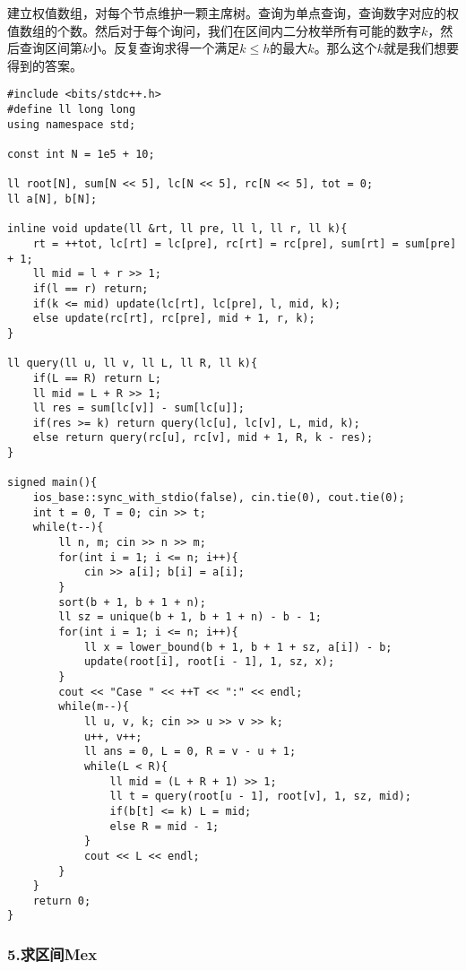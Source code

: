 \documentclass[]{article}
\begin{document}
建立权值数组，对每个节点维护一颗主席树。查询为单点查询，查询数字对应的权值数组的个数。然后对于每个询问，我们在区间内二分枚举所有可能的数字\(k\)，然后查询区间第\(k\)小。反复查询求得一个满足\(k \leq h\)的最大\(k\)。那么这个\(k\)就是我们想要得到的答案。

\begin{verbatim}
#include <bits/stdc++.h>
#define ll long long
using namespace std;

const int N = 1e5 + 10;

ll root[N], sum[N << 5], lc[N << 5], rc[N << 5], tot = 0;
ll a[N], b[N];

inline void update(ll &rt, ll pre, ll l, ll r, ll k){
    rt = ++tot, lc[rt] = lc[pre], rc[rt] = rc[pre], sum[rt] = sum[pre] + 1;
    ll mid = l + r >> 1;
    if(l == r) return;
    if(k <= mid) update(lc[rt], lc[pre], l, mid, k);
    else update(rc[rt], rc[pre], mid + 1, r, k);
}

ll query(ll u, ll v, ll L, ll R, ll k){
    if(L == R) return L;
    ll mid = L + R >> 1;
    ll res = sum[lc[v]] - sum[lc[u]];
    if(res >= k) return query(lc[u], lc[v], L, mid, k);
    else return query(rc[u], rc[v], mid + 1, R, k - res);
}

signed main(){
    ios_base::sync_with_stdio(false), cin.tie(0), cout.tie(0);
    int t = 0, T = 0; cin >> t;
    while(t--){
        ll n, m; cin >> n >> m;
        for(int i = 1; i <= n; i++){
            cin >> a[i]; b[i] = a[i];
        }
        sort(b + 1, b + 1 + n);
        ll sz = unique(b + 1, b + 1 + n) - b - 1;
        for(int i = 1; i <= n; i++){
            ll x = lower_bound(b + 1, b + 1 + sz, a[i]) - b;
            update(root[i], root[i - 1], 1, sz, x);
        }
        cout << "Case " << ++T << ":" << endl;
        while(m--){
            ll u, v, k; cin >> u >> v >> k;
            u++, v++;
            ll ans = 0, L = 0, R = v - u + 1;
            while(L < R){
                ll mid = (L + R + 1) >> 1;
                ll t = query(root[u - 1], root[v], 1, sz, mid);
                if(b[t] <= k) L = mid;
                else R = mid - 1;
            }
            cout << L << endl;
        }
    }
    return 0;
}
\end{verbatim}

\hypertarget{ux6c42ux533aux95f4mex}{%
\subsubsection{5.求区间Mex}\label{ux6c42ux533aux95f4mex}}
\end{document}

